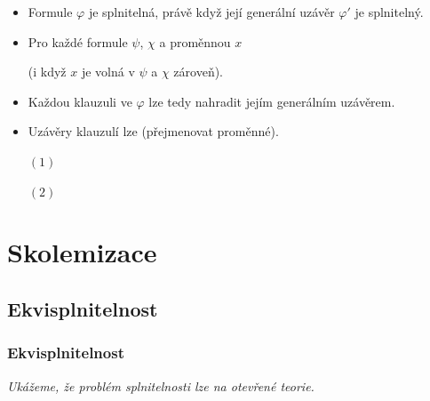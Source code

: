     \begin{itemize}
    \item Formule $\varphi$ je splnitelná, právě když její generální uzávěr $\varphi'$ je splnitelný.
    \smallskip
    
    \item Pro každé formule $\psi$, $\chi$ a proměnnou $x$
    \vspace{-2mm}
    
    \vspace{-6mm}
    (i když $x$ je volná v $\psi$ a $\chi$ zároveň).
    \smallskip
    
    \item Každou klauzuli ve $\varphi$ lze tedy nahradit jejím generálním uzávěrem.
    \smallskip
    
    \item Uzávěry klauzulí lze  (přejmenovat proměnné).
    \end{itemize}
    \medskip
    
    \begin{enumerate}
    \item[$(1)$] 
    \item[$(2)$] 
    \end{enumerate}
    
    


\section{Skolemizace}\label{section:skolemization}
\todo



\subsection{Ekvisplnitelnost}\todo

\subsubsection*{Ekvisplnitelnost}
    {\it Ukážeme, že problém splnitelnosti lze  na otevřené teorie.}
    \vspace{0.5mm}
    
